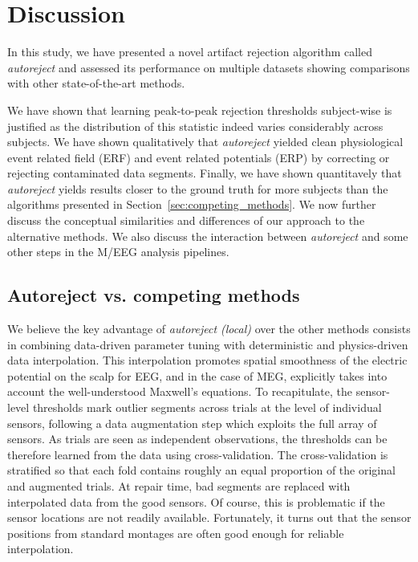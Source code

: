 \section{Discussion}
\label{sec:discussion}

In this study, we have presented a novel artifact rejection algorithm called \emph{autoreject} and assessed its performance on multiple datasets showing comparisons with other state-of-the-art methods.


We have shown that learning peak-to-peak rejection thresholds subject-wise is justified as the distribution of this statistic indeed varies considerably across subjects. We have shown qualitatively that \emph{autoreject} yielded clean physiological event related field (ERF) and event related potentials (ERP) by correcting or rejecting contaminated data segments. Finally, we have shown quantitavely that \emph{autoreject} yields results closer to the ground truth for more subjects than the algorithms presented in Section~\ref{sec:competing_methods}. We now further discuss the conceptual similarities and differences of our approach to the alternative methods. We also discuss the interaction between \emph{autoreject}
and some other steps in the M/EEG analysis pipelines.

\subsection{Autoreject vs. competing methods}

We believe the key advantage of \emph{autoreject (local)} over the other methods consists in combining data-driven parameter tuning with deterministic and physics-driven data interpolation. This interpolation promotes spatial smoothness of the electric potential on the scalp for EEG, and in the case of MEG, explicitly takes into account the well-understood Maxwell's equations. To recapitulate, the sensor-level thresholds mark outlier segments across trials at the level of individual sensors, following a data augmentation step which exploits the full array of sensors. As trials are seen as independent observations, the thresholds can be therefore learned from the data using cross-validation. The cross-validation is stratified so that each fold contains roughly an equal proportion of the original and augmented trials. At repair time, bad segments are replaced with interpolated data from the good sensors. Of course, this is problematic if the sensor locations are not readily available. Fortunately, it turns out that the sensor positions from standard montages are often good enough for reliable interpolation.

